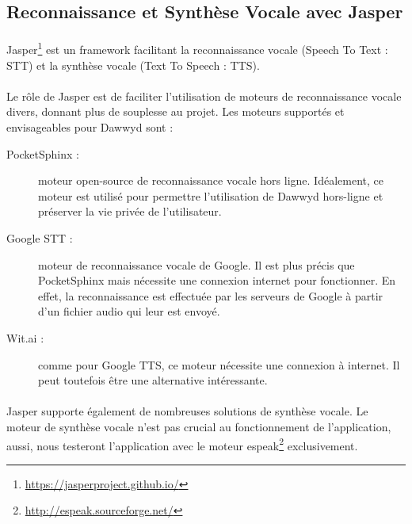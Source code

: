 \documentclass[12pt]{article}
\begin{document}
	    \subsection{Reconnaissance et Synthèse Vocale avec Jasper}
        \paragraph{}
        Jasper\footnote{\url{https://jasperproject.github.io/}} est un
        framework facilitant la reconnaissance vocale (Speech To Text : STT) et
        la synthèse vocale (Text To Speech : TTS).

	    \paragraph{}
        Le rôle de Jasper est de faciliter l'utilisation de moteurs de
        reconnaissance vocale divers, donnant plus de souplesse au projet. Les
        moteurs supportés et envisageables pour Dawwyd sont :

	    \begin{description}
            \item[PocketSphinx :] moteur open-source de reconnaissance vocale
                hors ligne. Idéalement, ce moteur est utilisé pour permettre
                l'utilisation de Dawwyd hors-ligne et préserver la vie privée
                de l'utilisateur.
            \item[Google STT :] moteur de reconnaissance vocale de Google. Il
                est plus précis que PocketSphinx mais nécessite une connexion
                internet pour fonctionner. En effet, la reconnaissance est
                effectuée par les serveurs de Google à partir d'un fichier
                audio qui leur est envoyé.
            \item[Wit.ai :] comme pour Google TTS, ce moteur nécessite une
                connexion à internet. Il peut toutefois être une alternative
                intéressante.
	    \end{description}

	    \paragraph{}
        Jasper supporte également de nombreuses solutions de synthèse vocale.
        Le moteur de synthèse vocale n'est pas crucial au fonctionnement de
        l'application, aussi, nous testeront l'application avec le moteur
        espeak\footnote{\url{http://espeak.sourceforge.net/}} exclusivement.
\end{document}
